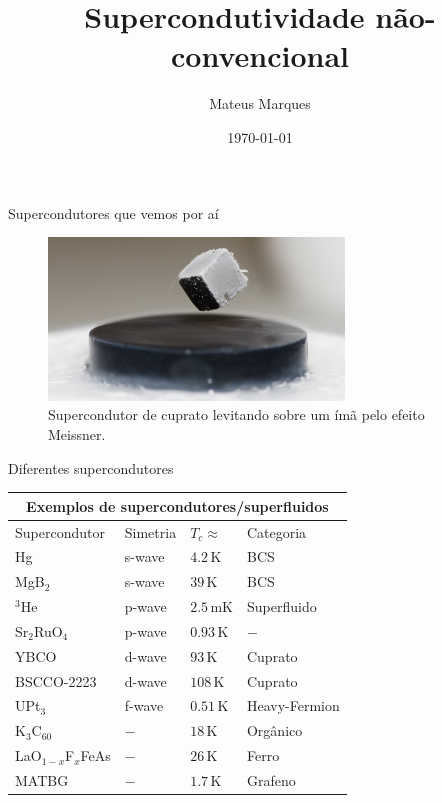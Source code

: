 \documentclass[8pt,aspectratio=169,xcolor={table,dvipsnames,usenames}]{beamer}
\title[Supercondutividade não-convencional]{\LARGE{Supercondutividade não-convencional}}
\author[Mateus Marques]{
\large{Mateus Marques
}}
\date{\today}
\begin{document}
\begin{frame}
  \titlepage
\end{frame}

\begin{frame}{Supercondutores que vemos por aí}

\begin{figure}[H]
\centering
\includegraphics[width=0.7\textwidth]{fig/levitating.jpg}
\caption{Supercondutor de cuprato levitando sobre um ímã pelo efeito Meissner.}
\label{fig:levitating}
\end{figure}

\end{frame}


\begin{frame}{Diferentes supercondutores}

\begin{center}
\begin{tabular}{ |p{3cm}||p{3cm}|p{3cm}|p{3cm}|  }
\hline
\multicolumn{4}{|c|}{Exemplos de supercondutores/superfluidos} \\
\hline
Supercondutor & Simetria & $T_c \approx$ & Categoria \\
\hline
Hg                   & s-wave   & $4.2   \, \text{K}$      & BCS \\
MgB$_2$              & s-wave   & $39    \, \text{K}$      & BCS \\
$^3$He               & p-wave   & $2.5   \, \text{mK}$     & Superfluido \\
Sr$_2$RuO$_4$        & p-wave   & $0.93  \, \text{K}$      & $-$ \\
YBCO                 & d-wave   & $93  \, \text{K}$        & Cuprato \\
BSCCO-2223           & d-wave   & $108   \, \text{K}$      & Cuprato \\
UPt$_3$              & f-wave   & $0.51  \, \text{K}$      & Heavy-Fermion \\
K$_3$C$_{60}$        & $-$      & $18    \, \text{K}$      & Orgânico  \\
LaO$_{1-x}$F$_x$FeAs & $-$      & $26    \, \text{K}$      & Ferro  \\
MATBG                & $-$      & $1.7    \, \text{K}$     & Grafeno  \\
\hline
\end{tabular}
\end{center}

\end{frame}
\end{document}
